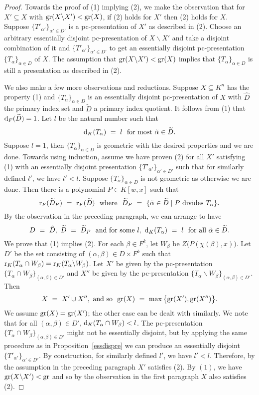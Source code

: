 \begin{proof}
Towards the proof of (1) implying (2), we make the observation that for $X' \subseteq X$ with $\mathrm{gr}(X \backslash X') < \mathrm{gr}(X)$, if (2) holds for $X'$ then (2) holds for $X$. Suppose $\{ {T'}_{\alpha'}\}_{ \alpha' \in D'}$ is a pc-presentation of $X'$ as described in (2). Choose an arbitrary essentially disjoint pc-presentation of $X \backslash X'$ and take a disjoint combination of it and $\{ {T'}_{\alpha'}\}_{ \alpha' \in D'}$ to get an essentially disjoint pc-presentation $ \{ T_\alpha\}_{ \alpha \in D}$ of $X$. The assumption that $\mathrm{gr}(X \backslash X') < \mathrm{gr}(X)$ implies that $ \{ T_\alpha\}_{ \alpha \in D}$ is still a presentation as described in (2).

We also make a few more observations and reductions. Suppose $X \subseteq K^n$ has the property (1) and $\{ T_\alpha\}_{ \alpha \in D}$ is an essentially disjoint pc-presentation of $X$ with $\hat{D}$ the primary index set and $\widetilde{D}$ a primary index quotient. It follows from (1) that $\mathrm{d}_F(\widetilde{D}) =1$. 
Let $l$ be the natural number such that 
$$\mathrm{d}_K( T_\alpha)\ =\ l\ \text{ for most } \tilde{\alpha} \in \widetilde{D}\textbf{} .$$
Suppose $l=1$, then $\{ T_\alpha\}_{ \alpha \in D}$ is geometric with the desired properties and we are done. Towards using induction, assume we have proven (2) for all $X'$ satisfying (1) with an essentially disjoint presentation  $\{ T'_{\alpha'}\}_{ \alpha' \in D'}$ such that for similarly defined $l'$, we have $l'<l$. Suppose  $\{ T_\alpha\}_{ \alpha \in D}$ is not geometric as otherwise we are done.
Then there is a polynomial $P \in K[w,x]$ such that 
$$\mr_F(\widetilde{D}_P)\ =\ \mr_F(\widetilde{D})\ \text{ where }\ \widetilde{D}_P\ =\ \{ \tilde{\alpha} \in \widetilde{D} \mid P  \text{ divides } T_\alpha \} .$$
By the observation in the preceding paragraph, we can arrange to have 
$$D\ =\ \hat{D},\  \widetilde{D}\ =\ \widetilde{D}_P\ \text{ and  for some } l,\ \md_K( T_\alpha)\ =\ l\ \text{ for all }  \tilde{\alpha} \in \widetilde{D}. $$
We prove that (1) implies (2). For each $\beta \in F^k$, let $W_\beta$ be $Z\big( P(\chi(\beta),x)\big)$. Let $D' $ be the set consisting of $(\alpha, \beta) \in D \times F^{k}$ such that  
$\mathrm{r}_K( T_\alpha \cap W_\beta) = \mathrm{r}_K(T_\alpha \backslash W_\beta)$. Let $X'$ be given by the pc-presentation $ \{ T_\alpha \cap W_\beta \}_{ (\alpha, \beta) \in D'}$ and $X''$ be given by the pc-presentation $ \{ T_\alpha \backslash W_\beta \}_{ (\alpha, \beta) \in D'}$. 
Then $$X\ =\ X'\cup X'',\ \text{and so }\ \gr(X)\ =\ \max\big\{\gr(X'), \gr(X'')\big\}.$$ We assume $\mathrm{gr}(X) = \mathrm{gr}(X')$; the other case can be dealt with similarly.  We note that for all $(\alpha, \beta) \in D'$, $\mathrm{d}_K(T_\alpha \cap W_\beta )<l$. The pc-presentation $ \{ T_\alpha \cap W_\beta \}_{ (\alpha, \beta) \in D'}$ might not be essentially disjoint, but by applying the same procedure as in Proposition~\ref{essdispre} we can produce an essentially disjoint $\{ T'_{\alpha'}\}_{ \alpha' \in D'}$. By construction, for similarly defined $l'$, we have $l'<l$. Therefore, by the assumption in the preceding paragraph $X'$ satisfies (2). By $(1)$, we have $\mathrm{gr}(X \backslash X')<\mathrm{gr}$ and so by the observation in the first paragraph $X$ also satisfies (2).


\end{proof}
